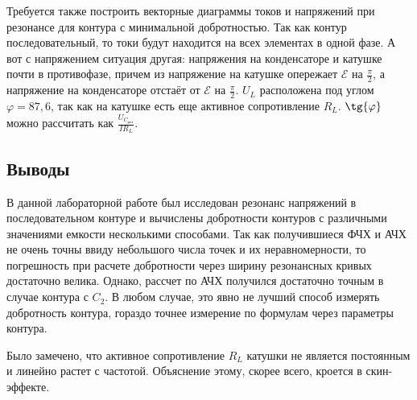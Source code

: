 \documentclass[a4paper, 12pt]{article}
\newcommand{\E}{\mathcal{E}}
\begin{document}
	Требуется также построить векторные диаграммы токов и напряжений при резонансе для контура с минимальной добротностью. Так как контур последовательный, то токи будут находится на всех элементах в одной фазе. А вот с напряжением ситуация другая: напряжения на конденсаторе и катушке почти в противофазе, причем из напряжение на катушке опережает $\E$ на $\frac{\pi}{2}$, а напряжение на конденсаторе отстаёт от $\E$ на $\frac{\pi}{2}$.
	$U_L$ расположена под углом $\varphi = 87,6$\textdegree, так как на катушке есть еще активное сопротивление $R_L$. $\tg{\varphi}$ можно рассчитать как $\frac{U_{C_{\text{рез}}}}{IR_L}$. 
	
	\subsection*{Выводы}
	
	В данной лабораторной работе был исследован резонанс напряжений в последовательном контуре и вычислены добротности контуров с различными значениями емкости несколькими способами. Так как получившиеся ФЧХ и АЧХ не очень точны ввиду небольшого числа точек и их неравномерности, то погрешность при расчете добротности через ширину резонансных кривых достаточно велика. Однако, рассчет по АЧХ получился достаточно точным в случае контура с $C_2$. В любом случае, это явно не лучший способ измерять добротность контура, гораздо точнее измерение по формулам через параметры контура. 
	
	Было замечено, что активное сопротивление $R_L$ катушки не является постоянным и линейно растет с частотой. Объяснение этому, скорее всего, кроется в скин-эффекте. 
\end{document}
